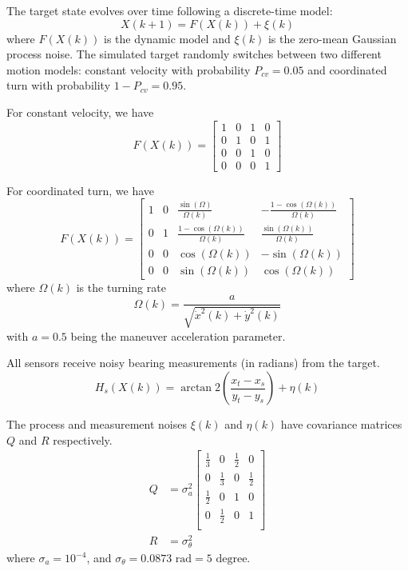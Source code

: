 \documentclass[10pt,letterpaper,final]{article}
\begin{document}
The target state evolves over time following a discrete-time model:
\begin{equation}
X(k+1) = F(X(k))+\xi(k)
\end{equation}
where $F(X(k))$ is the dynamic model and $\xi(k)$ is the zero-mean Gaussian process noise. The simulated target randomly switches between two different motion models: constant velocity with probability $P_{cv} = 0.05$ and coordinated turn with probability $1-P_{cv}=0.95$. 

For constant velocity, we have
\begin{equation}
F(X(k)) = 
\left[
\begin{array}{cccc}
1 & 0 & 1 & 0 \\
0 & 1 & 0 & 1 \\
0 & 0 & 1 & 0 \\
0 & 0 & 0 & 1
\end{array}
\right]
\end{equation}

For coordinated turn, we have 
\begin{equation}
F(X(k)) = 
\left[
\begin{array}{cccc}
1 & 0 & \frac{\sin(\Omega)}{\Omega (k)} & -\frac{1-\cos(\Omega (k))}{\Omega (k)} \\
0 & 1 & \frac{1-\cos(\Omega (k))}{\Omega (k)} & \frac{\sin(\Omega (k))}{\Omega (k)} \\
0 & 0 & \cos(\Omega (k)) & -\sin(\Omega (k)) \\
0 & 0 & \sin(\Omega (k)) & \cos(\Omega (k)) 
\end{array}
\right]
\end{equation}
where $\Omega (k)$ is the turning rate
\begin{equation}
\Omega (k) = \frac{a}{\sqrt{\dot{x}^2(k)+\dot{y}^2(k)}}
\end{equation}
with $a=0.5$ being the maneuver acceleration parameter. 

All sensors receive noisy bearing measurements (in radians) from the target.
\begin{equation}
H_s(X(k))= \arctan2 \left( \frac{x_t-x_s}{y_t-y_s} \right) + \eta(k)
\end{equation}

The process and measurement noises $\xi(k)$ and $\eta(k)$ have covariance matrices $Q$ and $R$ respectively.
\begin{align}
Q &= \sigma_a^2
\left[
\begin{array}{cccc}
\frac{1}{3} & 0 & \frac{1}{2} & 0 \\
0 & \frac{1}{3} & 0 & \frac{1}{2} \\
\frac{1}{2} & 0 & 1 & 0 \\
0 & \frac{1}{2} & 0 & 1 \\
\end{array}
\right]\\
R &= \sigma_{\theta}^2
\end{align}
where $\sigma_a=10^{-4}$, and $\sigma_{\theta}=0.0873\text{ rad} = 5 \text{ degree}$.
\end{document}
